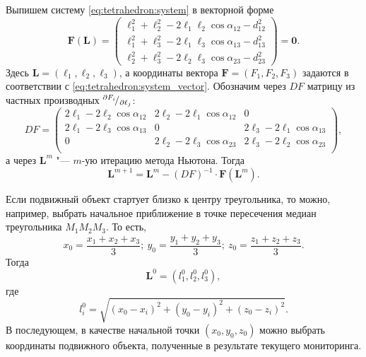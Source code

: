 \documentclass[../main.tex]{subfiles}
\begin{document}
Выпишем систему \eqref{eq:tetrahedron:system} в векторной форме
\begin{equation}\label{eq:tetrahedron:system_vector}
  \mathbf{F} (\mathbf{L})=
  \left(
    \begin{matrix}
      \ell_1^2+\ell_2^2-2 \ell_1 \ell_2 \cos \alpha_{12} - d_{12}^2 \\
      \ell_1^2+\ell_3^2-2 \ell_1 \ell_3 \cos \alpha_{13} - d_{13}^2 \\
      \ell_2^2+\ell_3^2-2 \ell_2 \ell_3 \cos \alpha_{23} - d_{23}^2
    \end{matrix}
  \right)
  = \mathbf{0}.
\end{equation}
Здесь $\mathbf{L}=(\ell_1,\ell_2,\ell_3)$, а координаты вектора $\mathbf{F}=(F_1, F_2,F_3)$ задаются в соответствии с \eqref{eq:tetrahedron:system_vector}. Обозначим через  $DF$ матрицу из частных производных ${}^{\partial F_i}\!/_{\partial \ell_j}$:
\begin{equation*}
DF=
\left(
  \begin{matrix}
    2\ell_1 - 2\ell_2 \cos \alpha_{12} & 2\ell_2 - 2\ell_1 \cos \alpha_{12} & 0  \\
    2\ell_1 - 2\ell_3 \cos \alpha_{13} & 0 & 2\ell_3 - 2\ell_1 \cos \alpha_{13}  \\
    0 & 2\ell_2 - 2\ell_3 \cos \alpha_{23} & 2\ell_3 - 2\ell_2 \cos \alpha_{23}  \\
  \end{matrix}
\right),
\end{equation*}
а через $\mathbf{L}^m$ "--- $m$-ую итерацию метода Ньютона. Тогда
\begin{equation*}
  \mathbf{L}^{m + 1} = \mathbf{L}^{m} - \left(DF\right)^{-1} \cdot \mathbf{F}\left(\mathbf{L}^{m}\right).
\end{equation*}

Если подвижный объект стартует близко к центру треугольника, то можно, например, выбрать начальное приближение в точке пересечения медиан треугольника $M_1 M_2 M_3$. То есть,
\begin{equation*}
  x_{0} = \frac{x_1 + x_2 + x_3}{3};\
  y_{0} = \frac{y_1 + y_2 + y_3}{3};\
  z_{0} = \frac{z_1 + z_2 + z_3}{3}.
\end{equation*}
Тогда
\begin{equation*}
  \mathbf{L}^0 = \left(l_1^0, l_2^0, l_3^0\right),
\end{equation*}
где
\begin{equation*}
  l_i^0 = \sqrt{\left(x_0 - x_i\right)^2 + \left(y_0 - y_i\right)^2 + \left(z_0 - z_i\right)^2}.
\end{equation*}
В последующем, в качестве начальной точки $\left(x_0, y_0, z_0\right)$ можно выбрать координаты подвижного объекта, полученные в результате текущего мониторинга.
\end{document}

